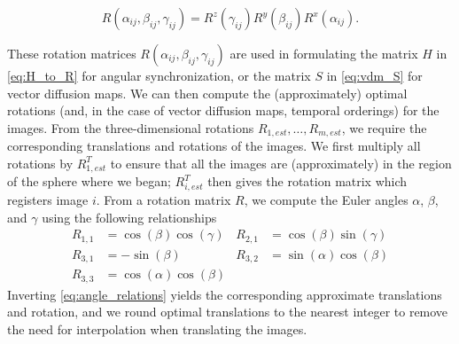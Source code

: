 \documentclass{pnastwo}
\begin{document}
\begin{article}
\begin{materials}
\begin{equation} \label{eq:total_rot}
	R(\alpha_{ij}, \beta_{ij}, \gamma_{ij})	 = R^z(\gamma_{ij})  R^y(\beta_{ij})  R^x(\alpha_{ij}).
\end{equation}
%

These rotation matrices $R(\alpha_{ij}, \beta_{ij}, \gamma_{ij})$ are used in formulating the matrix $H$ in \eqref{eq:H_to_R} for angular synchronization, or the matrix $S$ in \eqref{eq:vdm_S} for vector diffusion maps.
%
We can then compute the (approximately) optimal rotations (and, in the case of vector diffusion maps, temporal orderings) for the images.
%
From the three-dimensional rotations $R_{1, est}, \dots, R_{m, est}$, we  require the corresponding translations and rotations of the images.
%
We first multiply all rotations by $R_{1, est}^T$ to ensure that all the images are (approximately) in the region of the sphere where we began;
$R_{i,est}^T$ then gives the rotation matrix which registers image $i$.
%
From a rotation matrix $R$, we compute the Euler angles $\alpha$, $\beta$, and $\gamma$ using the following relationships
\begin{equation}
\begin{aligned}
R_{1,1} & = \cos(\beta)\cos(\gamma) &
R_{2,1} & = \cos(\beta)\sin(\gamma) \\
R_{3,1} & = -\sin(\beta) &
R_{3,2} & = \sin(\alpha)\cos(\beta) \\
R_{3,3} & = \cos(\alpha)\cos(\beta)  &
\end{aligned}
\end{equation}
%
Inverting \eqref{eq:angle_relations} yields the corresponding approximate translations and rotation, and we round optimal translations to the nearest integer to remove the need for interpolation when translating the images.


\end{materials}
\end{article}
\end{document}

